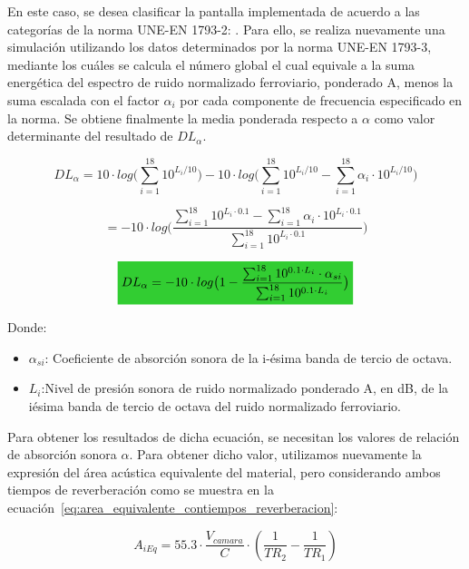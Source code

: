 \par En este caso, se desea clasificar la pantalla implementada de acuerdo a las categorías de la norma UNE-EN 1793-2: . Para ello, se realiza nuevamente una simulación utilizando los datos determinados por la norma UNE-EN 1793-3, mediante los cuáles se calcula el número global el cual equivale a la suma energética del espectro de ruido normalizado ferroviario, ponderado A, menos la suma escalada con el factor $\alpha_i$ por cada componente de frecuencia especificado en la norma. Se obtiene finalmente la media ponderada respecto a $\alpha$ como valor determinante del resultado de $DL_\alpha$.

$$
        DL_\alpha  = 10 \cdot log \Big(\sum^{18}_{i=1} 10^{{L_i}/{10}} \Big) - 10 \cdot log  \Big( \sum_{i=1}^{18} 10^{{L_i}/{10}} - \sum_{i=1}^{18} \alpha_i \cdot 10^{{L_i}/{10}} \Big) $$
    
$$
        = - 10 \cdot log \Big(\frac{\sum^{18}_{i=1} 10^{{L_i}\cdot0.1} - \sum^{18}_{i=1} \alpha_i \cdot 10^{{L_i}\cdot0.1} }{\sum^{18}_{i=1} 10^{{L_i}\cdot0.1}} \Big)  $$


\begin{equation}
         \mathcolorbox{EQColor}{DL_\alpha = -10\cdot log \big( 1- \frac{\sum_{i=1}^{18} 10^{0.1 \cdot L_i} \cdot \alpha_{si} }{\sum^{18}_{i=1} 10^{0.1 \cdot L_i} }\big)}
    \label{eq:DL_a}
\end{equation}

\par Donde:
\begin{itemize}
    \item $\alpha_{si}$: Coeficiente de absorción sonora de la i-ésima banda de tercio de octava.
    \item $L_i$:Nivel de presión sonora de ruido normalizado ponderado A, en dB, de la iésima banda de tercio de octava del ruido normalizado ferroviario.
\end{itemize}

\par Para obtener los resultados de dicha ecuación, se necesitan los valores de relación de absorción sonora $\alpha$. Para obtener dicho valor, utilizamos nuevamente la expresión del área acústica equivalente del material, pero considerando ambos tiempos de reverberación como se muestra en la ecuación~\eqref{eq:area_equivalente_contiempos_reverberacion}:

\begin{equation}
    A_{iEq} = 55.3 \cdot \frac{V_{camara}}{C} \cdot (\frac{1}{TR_2} - \frac{1}{TR_1})
    \label{eq:area_equivalente_contiempos_reverberacion}
\end{equation}

